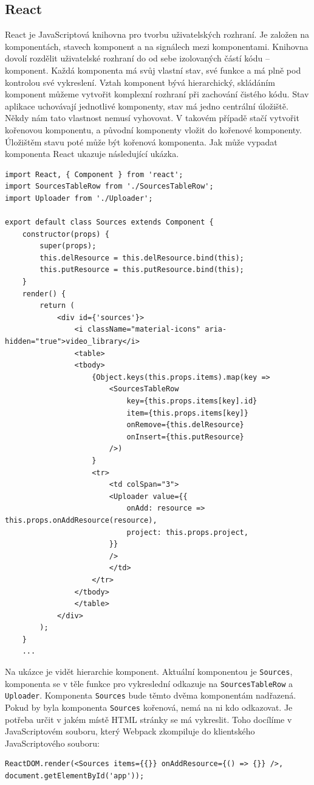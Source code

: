 \subsection{React}
React je JavaScriptová knihovna pro tvorbu uživatelských rozhraní. Je založen na komponentách, stavech komponent a na signálech mezi komponentami. Knihovna dovolí rozdělit uživatelské rozhraní do od sebe izolovaných částí kódu -- komponent. Každá komponenta má svůj vlastní stav, své funkce a má plně pod kontrolou své vykreslení. Vztah komponent bývá hierarchický, skládáním komponent můžeme vytvořit komplexní rozhraní při zachování čistého kódu. Stav aplikace uchovávají jednotlivé komponenty, stav má jedno centrální úložiště. Někdy nám tato vlastnost nemusí vyhovovat. V takovém případě stačí vytvořit kořenovou komponentu, a původní komponenty vložit do kořenové komponenty. Úložištěm stavu poté může být kořenová komponenta. Jak může vypadat komponenta React ukazuje následující ukázka.
\begin{lstlisting}[style=JavaScript]
import React, { Component } from 'react';
import SourcesTableRow from './SourcesTableRow';
import Uploader from './Uploader';

export default class Sources extends Component {
    constructor(props) {
        super(props);
        this.delResource = this.delResource.bind(this);
        this.putResource = this.putResource.bind(this);
    }
    render() {
        return (
            <div id={'sources'}>
                <i className="material-icons" aria-hidden="true">video_library</i>
                <table>
                <tbody>
                    {Object.keys(this.props.items).map(key =>
                        <SourcesTableRow
                            key={this.props.items[key].id}
                            item={this.props.items[key]}
                            onRemove={this.delResource}
                            onInsert={this.putResource}
                        />)
                    }
                    <tr>
                        <td colSpan="3">
                        <Uploader value={{
                            onAdd: resource => this.props.onAddResource(resource),
                            project: this.props.project,
                        }}
                        />
                        </td>
                    </tr>
                </tbody>
                </table>
            </div>
        );
    }
    ...
\end{lstlisting}

Na ukázce je vidět hierarchie komponent. Aktuální komponentou je \texttt{Sources}, komponenta se v těle funkce pro vykreslední odkazuje na \texttt{SourcesTableRow} a \texttt{Uploader}. Komponenta \texttt{Sources} bude těmto dvěma komponentám nadřazená. Pokud by byla komponenta \texttt{Sources} kořenová, nemá na ni kdo odkazovat. Je potřeba určit v jakém místě HTML stránky se má vykreslit. Toho docílíme v JavaScriptovém souboru, který Webpack zkompiluje do klientského JavaScriptového souboru:
\begin{lstlisting}[style=JavaScript]
ReactDOM.render(<Sources items={{}} onAddResource={() => {}} />, document.getElementById('app'));
\end{lstlisting}

